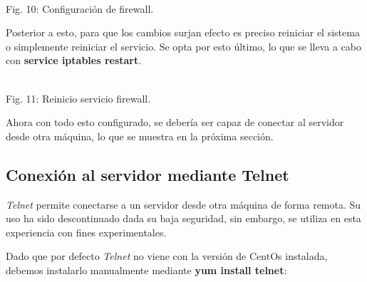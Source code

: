 \documentclass[11pt]{article}
\begin{document}
\begin{minipage}[t]{\linewidth}
    \raggedright
\medskip
     \\Fig. 10: Configuración de firewall.\\
\end{minipage}
\newpage
Posterior a esto, para que los cambios surjan efecto es preciso reiniciar el sistema o simplemente reiniciar el servicio. Se opta por esto último, lo que se lleva a cabo con \textbf{service iptables restart}.\\

\begin{minipage}[t]{\linewidth}
    \raggedright
\medskip
     \\Fig. 11: Reinicio servicio firewall.\\
\end{minipage}

Ahora con todo esto configurado, se debería ser capaz de conectar al servidor desde otra máquina, lo que se muestra en la próxima sección.

\subsection{Conexión al servidor mediante Telnet}
\textit{Telnet} permite conectarse a un servidor desde otra máquina de forma remota. Su uso ha sido descontinuado dada su baja seguridad, sin embargo, se utiliza en esta experiencia con fines experimentales.\par
Dado que por defecto \textit{Telnet} no viene con la versión de CentOs instalada, debemos instalarlo manualmente mediante \textbf{yum install telnet}:\\
\end{document}
